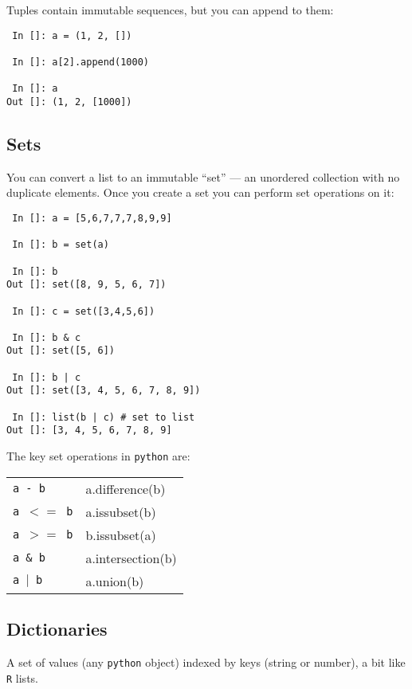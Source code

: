 Tuples contain immutable sequences, but you can append to them:

\begin{lstlisting} 
 In []: a = (1, 2, [])
 
 In []: a[2].append(1000)
 
 In []: a
Out []: (1, 2, [1000])
\end{lstlisting}

\subsection{Sets}
You can convert a list to an immutable ``set'' --- an unordered 
collection with no duplicate elements. Once you create a set you
can perform set operations on it:

\begin{lstlisting} 
 In []: a = [5,6,7,7,7,8,9,9]

 In []: b = set(a)

 In []: b
Out []: set([8, 9, 5, 6, 7])

 In []: c = set([3,4,5,6])

 In []: b & c
Out []: set([5, 6])

 In []: b | c
Out []: set([3, 4, 5, 6, 7, 8, 9])

 In []: list(b | c) # set to list
Out []: [3, 4, 5, 6, 7, 8, 9]

\end{lstlisting}

The key set operations in {\tt python} are: 

\begin{tabular}{p{2.5cm} p{10cm}} 
	{\tt a - b } & a.difference(b)\\
	{\tt a $<=$ b} & a.issubset(b)\\
	{\tt a $>=$ b} & b.issubset(a)\\
	{\tt a \& b} & a.intersection(b)\\
	{\tt a $\vert$ b} & a.union(b)\\
\end{tabular}

\subsection{Dictionaries}

A set of values (any {\tt python} object) indexed by keys (string or 
number), a bit like {\tt R} lists.

